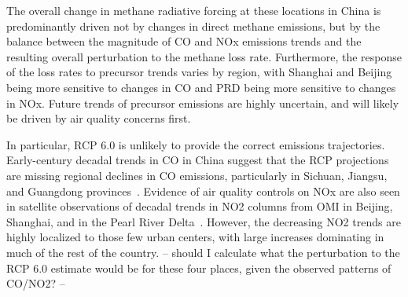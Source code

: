 
The overall change in methane radiative forcing at these locations in China is predominantly driven not by changes in direct methane emissions, but by the balance between the magnitude of CO and NOx emissions trends and the resulting overall perturbation to the methane loss rate. Furthermore, the response of the loss rates to precursor trends varies by region, with Shanghai and Beijing being more sensitive to changes in CO and PRD being more sensitive to changes in NOx. Future trends of precursor emissions are highly uncertain, and will likely be driven by air quality concerns first.

In particular, RCP 6.0 is unlikely to provide the correct emissions trajectories. Early-century decadal trends in CO in China suggest that the RCP projections are missing regional declines in CO emissions, particularly in Sichuan, Jiangsu, and Guangdong provinces~\citep{ref:zhao2012}. Evidence of air quality controls on NOx are also seen in satellite observations of decadal trends in NO2 columns from OMI in Beijing, Shanghai, and in the Pearl River Delta~\citep{ref:duncan2016}. However, the decreasing NO2 trends are highly localized to those few urban centers, with large increases dominating in much of the rest of the country. -- should I calculate what the perturbation to the RCP 6.0 estimate would be for these four places, given the observed patterns of CO/NO2? --

